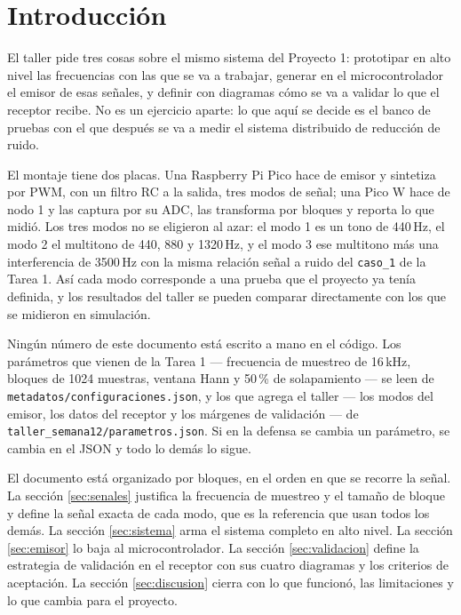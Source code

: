 
\section{Introducción}

El taller pide tres cosas sobre el mismo sistema del Proyecto 1: prototipar en
alto nivel las frecuencias con las que se va a trabajar, generar en el
microcontrolador el emisor de esas señales, y definir con diagramas cómo se va a
validar lo que el receptor recibe. No es un ejercicio aparte: lo que aquí se
decide es el banco de pruebas con el que después se va a medir el sistema
distribuido de reducción de ruido.

El montaje tiene dos placas. Una Raspberry Pi Pico hace de emisor y sintetiza por
PWM, con un filtro RC a la salida, tres modos de señal; una Pico W hace de nodo 1
y las captura por su ADC, las transforma por bloques y reporta lo que midió. Los
tres modos no se eligieron al azar: el modo 1 es un tono de 440\,Hz, el modo 2 el
multitono de 440, 880 y 1320\,Hz, y el modo 3 ese multitono más una interferencia
de 3500\,Hz con la misma relación señal a ruido del \texttt{caso\_1} de la Tarea 1.
Así cada modo corresponde a una prueba que el proyecto ya tenía definida, y los
resultados del taller se pueden comparar directamente con los que se midieron en
simulación.

Ningún número de este documento está escrito a mano en el código. Los parámetros
que vienen de la Tarea 1 --- frecuencia de muestreo de 16\,kHz, bloques de 1024
muestras, ventana Hann y 50\,\% de solapamiento --- se leen de
\texttt{metadatos/configu\-raciones.json}, y los que agrega el taller --- los modos
del emisor, los datos del receptor y los márgenes de validación --- de
\texttt{taller\_semana12/parametros.json}. Si en la defensa se cambia un
parámetro, se cambia en el JSON y todo lo demás lo sigue.

El documento está organizado por bloques, en el orden en que se recorre la señal.
La sección \ref{sec:senales} justifica la frecuencia de muestreo y el tamaño de
bloque y define la señal exacta de cada modo, que es la referencia que usan todos
los demás. La sección \ref{sec:sistema} arma el sistema completo en alto nivel. La
sección \ref{sec:emisor} lo baja al microcontrolador. La sección
\ref{sec:validacion} define la estrategia de validación en el receptor con sus
cuatro diagramas y los criterios de aceptación. La sección \ref{sec:discusion}
cierra con lo que funcionó, las limitaciones y lo que cambia para el proyecto.
